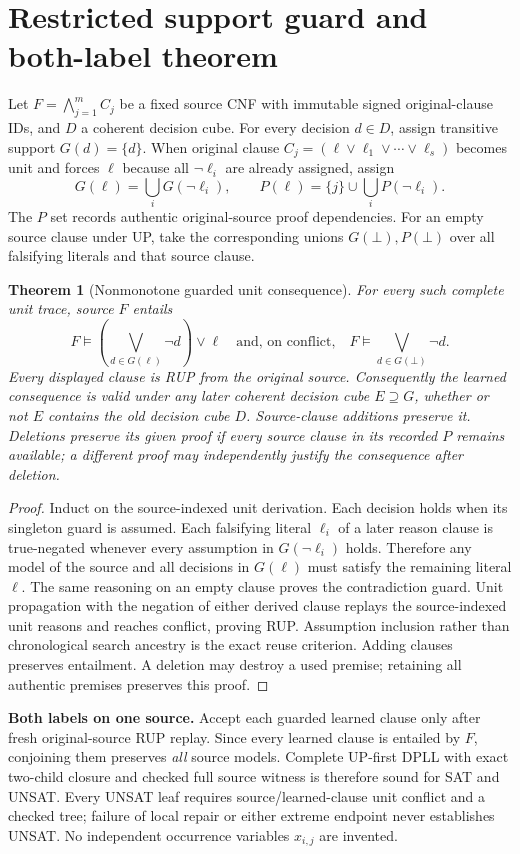 \documentclass[11pt]{article}
\newtheorem{theorem}{Theorem}
\begin{document}
\section{Restricted support guard and both-label theorem}
Let $F=\bigwedge_{j=1}^m C_j$ be a fixed source CNF with immutable signed
original-clause IDs, and $D$ a coherent decision cube. For every decision
$d\in D$, assign transitive support $G(d)=\{d\}$. When original clause
$C_j=(\ell\vee\ell_1\vee\cdots\vee\ell_s)$ becomes unit and forces $\ell$
because all $\neg\ell_i$ are already assigned, assign
\[
G(\ell)=\bigcup_i G(\neg\ell_i),\qquad
P(\ell)=\{j\}\cup\bigcup_i P(\neg\ell_i).
\]
The $P$ set records authentic original-source proof dependencies.
For an empty source clause under UP, take the corresponding unions
$G(\bot),P(\bot)$ over all falsifying literals and that source clause.

\begin{theorem}[Nonmonotone guarded unit consequence]
For every such complete unit trace, source $F$ entails
\[
 F\models\left(\bigvee_{d\in G(\ell)}\neg d\right)\vee\ell
 \quad\text{and, on conflict,}\quad
 F\models\bigvee_{d\in G(\bot)}\neg d.
\]
Every displayed clause is RUP from the original source. Consequently
the learned consequence is valid under any later coherent decision cube
$E\supseteq G$, whether or not $E$ contains the old decision cube $D$.
Source-clause additions preserve it. Deletions preserve its \emph{given
proof} if every source clause in its recorded $P$ remains available; a
different proof may independently justify the consequence after deletion.
\end{theorem}
\begin{proof}
Induct on the source-indexed unit derivation. Each decision holds when its
singleton guard is assumed. Each falsifying literal $\ell_i$ of a later
reason clause is true-negated whenever every assumption in
$G(\neg\ell_i)$ holds. Therefore any model of the source and all decisions
in $G(\ell)$ must satisfy the remaining literal $\ell$. The same
reasoning on an empty clause proves the contradiction guard. Unit
propagation with the negation of either derived clause replays the
source-indexed unit reasons and reaches conflict, proving RUP. Assumption
inclusion rather than chronological search ancestry is the exact reuse
criterion. Adding clauses preserves entailment. A deletion may destroy
a used premise; retaining all authentic premises preserves this proof.
\end{proof}

\noindent\textbf{Both labels on one source.} Accept each guarded learned
clause only after fresh original-source RUP replay. Since every learned
clause is entailed by $F$, conjoining them preserves \emph{all} source
models. Complete UP-first DPLL with exact two-child closure and checked
full source witness is therefore sound for SAT and UNSAT. Every UNSAT
leaf requires source/learned-clause unit conflict and a checked tree;
failure of local repair or either extreme endpoint never establishes
UNSAT. No independent occurrence variables $x_{i,j}$ are invented.
\end{document}
